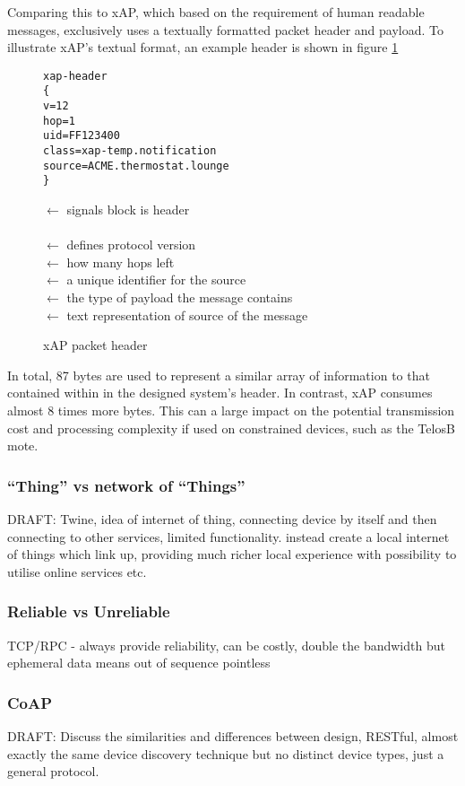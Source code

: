 Comparing this to xAP, which based on the requirement of human readable messages, exclusively uses a textually formatted packet header and payload. To illustrate xAP's textual format, an example header is shown in figure \ref{fig:xapHeader}
\begin{figure}[h!]
\begin{minipage}{.5\textwidth}
\begin{verbatim}
xap-header
{
v=12
hop=1
uid=FF123400
class=xap-temp.notification
source=ACME.thermostat.lounge
}
\end{verbatim}
\end{minipage}%
\begin{minipage}{.5\textwidth}
$\leftarrow$ signals block is header\\
\\
$\leftarrow$ defines protocol version\\
$\leftarrow$ how many hops left\\
$\leftarrow$ a unique identifier for the source\\
$\leftarrow$ the type of payload the message contains\\
$\leftarrow$ text representation of source of the message\\
\end{minipage}
\caption{xAP packet header}
\label{fig:xapHeader}
\end{figure}
In total, 87 bytes are used to represent a similar array of information to that contained within in the designed system's header. In contrast, xAP consumes almost 8 times more bytes. This can a large impact on the potential transmission cost and processing complexity if used on constrained devices, such as the TelosB mote.

\subsubsection{``Thing'' vs network of ``Things''} %
\label{ssub:_thing_vs_network_of_things_}
DRAFT: Twine, idea of internet of thing, connecting device by itself and then connecting to other services, limited functionality. instead create a local internet of things which link up, providing much richer local experience with possibility to utilise online services etc.

\subsubsection{Reliable vs Unreliable} %
\label{ssub:reliable_vs_unreliable}
TCP/RPC - always provide reliability, can be costly, double the bandwidth but ephemeral data means out of sequence pointless

\subsubsection{CoAP} %
\label{ssub:coap}
DRAFT: Discuss the similarities and differences between design, RESTful, almost exactly the same device discovery technique but no distinct device types, just a general protocol.
